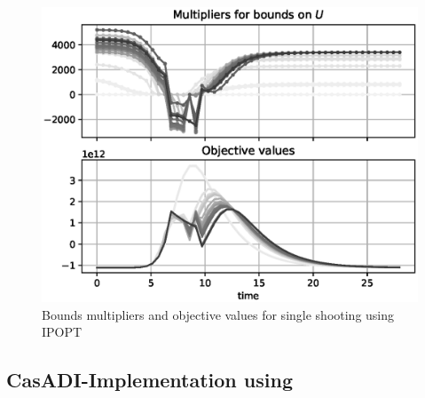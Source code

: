 \begin{figure}[H]
    \centering
    \includegraphics[width=.8\textwidth]{pythonProject/Figures/Single_Shooting_obj_con_IPOPT.eps}
    \caption{Bounds multipliers and objective values for single shooting using IPOPT}
    \label{fig:SH_con_obj_IPOPT}
\end{figure}



\subsection{CasADI-Implementation using }